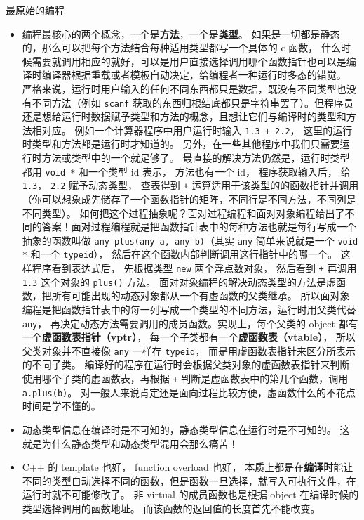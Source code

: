 
\begin{issues}
\issueDraft
\end{issues}

最原始的编程
\begin{itemize}
\item 编程最核心的两个概念，一个是\textbf{方法}，一个是\textbf{类型}。 如果是一切都是静态的，那么可以把每个方法结合每种适用类型都写一个具体的 c 函数， 什么时候需要就调用相应的就好，可以是用户直接选择调用哪个函数指针也可以是编译时编译器根据重载或者模板自动决定，给编程者一种运行时多态的错觉。 严格来说，运行时用户输入的任何不同东西都只是数据，既没有不同类型也没有不同方法（例如 \verb`scanf` 获取的东西归根结底都只是字符串罢了）。但程序员还是想给运行时数据赋予类型和方法的概念，且想让它们与编译时的类型和方法相对应。 例如一个计算器程序中用户运行时输入 \verb`1.3 + 2.2`， 这里的运行时类型和方法都是运行时才知道的。 另外，在一些其他程序中我们只需要运行时方法或类型中的一个就足够了。 最直接的解决方法仍然是，运行时类型都用 \verb`void *` 和一个类型 id 表示， 方法也有一个 id， 程序获取输入后， 给 \verb`1.3`， \verb`2.2` 赋予动态类型， 查表得到 \verb`+` 运算适用于该类型的的函数指针并调用（你可以想象成先储存了一个函数指针的矩阵，不同行是不同方法，不同列是不同类型）。 如何把这个过程抽象呢？面对过程编程和面对对象编程给出了不同的答案！面对过程编程就是把函数指针表中的每种方法也就是每行写成一个抽象的函数叫做 \verb`any plus(any a, any b)`（其实 \verb`any` 简单来说就是一个 \verb`void *` 和一个 \verb`typeid`）， 然后在这个函数内部判断调用这行指针中的哪一个。 这样程序看到表达式后， 先根据类型 \verb`new` 两个浮点数对象， 然后看到 \verb`+` 再调用 \verb`1.3` 这个对象的 \verb`plus()` 方法。 面对对象编程的解决动态类型的方法是虚函数，把所有可能出现的动态对象都从一个有虚函数的父类继承。 所以面对象编程是把函数指针表中的每一列写成一个类型的不同方法，运行时用父类代替 \verb`any`， 再决定动态方法需要调用的成员函数。实现上，每个父类的 object 都有一个\textbf{虚函数表指针（vptr）}， 每一个子类都有一个\textbf{虚函数表（vtable）}， 所以父类对象并不直接像 \verb`any` 一样存 \verb`typeid`， 而是用虚函数表指针来区分所表示的不同子类。 编译好的程序在运行时会根据父类对象的虚函数表指针来判断使用哪个子类的虚函数表，再根据 \verb`+` 判断是虚函数表中的第几个函数，调用 \verb`a.plus(b)`。 对一般人来说肯定还是面向过程比较方便，虚函数什么的不花点时间是学不懂的。
\item 动态类型信息在编译时是不可知的，静态类型信息在运行时是不可知的。 这就是为什么静态类型和动态类型混用会那么痛苦！
\item C++ 的 template 也好， function overload 也好， 本质上都是在\textbf{编译时}能让不同的类型自动选择不同的函数，但是函数一旦选择，就写入可执行文件，在运行时就不可能修改了。 非 virtual 的成员函数也是根据 object 在编译时候的类型选择调用的函数地址。 而该函数的返回值的长度首先不能改变。

\end{itemize}

